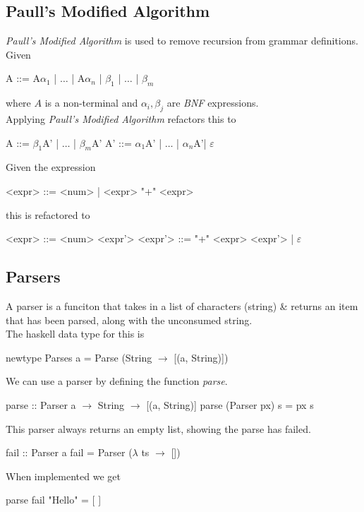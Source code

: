 \documentclass[11pt,a4paper]{article}
\begin{document}
\subsection{Paull's Modified Algorithm}

\textit{Paull's Modified Algorithm} is used to remove recursion from grammar definitions.\\ %
Given
\begin{code}
A ::= A$\alpha_1$ | $\dots$ | A$\alpha_n$ | $\beta_1$ | $\dots$ | $\beta_m$
\end{code}
where $A$ is a non-terminal and $\alpha_i, \beta_j$ are \textit{BNF} expressions.\\
Applying \textit{Paull's Modified Algorithm} refactors this to
\begin{code}
A  ::= $\beta_1$A' | $\dots$ | $\beta_m$A'
A' ::= $\alpha_1$A' | $\dots$ | $\alpha_n$A'| $\varepsilon$
\end{code}

Given the expression
\begin{code}
<expr> ::= <num>
         | <expr> "+" <expr>
\end{code}
this is refactored to
\begin{code}
<expr>  ::= <num> <expr'>
<expr'> ::= "+" <expr> <expr'> | $\varepsilon$
\end{code}

\subsection{Parsers}

A parser is a funciton that takes in a list of characters (string) \& returns an item that has been parsed, along with the unconsumed string.\\
The haskell data type for this is
\begin{code}
newtype Parses a = Parse (String $\to$ [(a, String)])
\end{code}

We can use a parser by defining the function \textit{parse}.
\begin{code}
parse :: Parser a $\to$ String $\to$ [(a, String)]
parse (Parser px) s = px s
\end{code}

This parser always returns an empty list, showing the parse has failed.
\begin{code}
fail :: Parser a
fail = Parser ($\lambda$ ts $\to$ [])
\end{code}
When implemented we get
\begin{code}
parse fail "Hello" = [ ]
\end{code}
\end{document}
